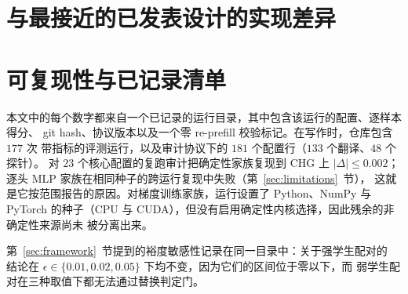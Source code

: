 \documentclass[10pt,a4paper,fontset=fandol]{ctexart}
\begin{document}



\appendix

\section{与最接近的已发表设计的实现差异}
\label{app:impl}

\begin{table}[h]
\centering
\caption{我们对最接近的严格零 re-prefill 设计~\citep{heo2026} 的实现，以及它与
参照的差异。我们实现的两种配置都失败（表~\ref{tab:main}）。}
\label{tab:impl}
\end{table}

\section{可复现性与已记录清单}
\label{app:repro}

本文中的每个数字都来自一个已记录的运行目录，其中包含该运行的配置、逐样本得分、
git hash、协议版本以及一个零 re-prefill 校验标记。在写作时，仓库包含 $177$ 次
带指标的评测运行，以及审计协议下的 $181$ 个配置行（$133$ 个翻译、$48$ 个探针）。
对 $23$ 个核心配置的复跑审计把确定性家族复现到 CHG 上 $|\Delta| \le 0.002$；
逐头 MLP 家族在相同种子的跨运行复现中失败（第~\ref{sec:limitations}~节），
这就是它按范围报告的原因。对梯度训练家族，运行设置了 Python、NumPy 与 PyTorch
的种子（CPU 与 CUDA），但没有启用确定性内核选择，因此残余的非确定性来源尚未
被分离出来。

第~\ref{sec:framework}~节提到的裕度敏感性记录在同一目录中：关于强学生配对的
结论在 $\epsilon\in\{0.01,0.02,0.05\}$ 下均不变，因为它们的区间位于零以下，而
弱学生配对在三种取值下都无法通过替换判定门。
\end{document}
